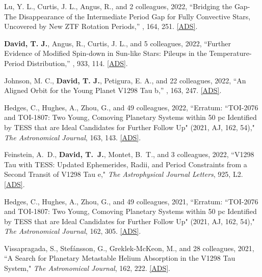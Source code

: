 \item {{Lu}, Y. L.}, {{Curtis}, J. L.}, {{Angus}, R.}, and 2 colleagues, 2022, ``{Bridging the Gap-The Disappearance of the Intermediate Period Gap for Fully Convective Stars, Uncovered by New ZTF Rotation Periods},'' \textit{\aj}, 164, 251. \href{https://ui.adsabs.harvard.edu/abs/2022AJ....164..251L}{[ADS]}.

\item {{\bf{David}, T. J.}}, {{Angus}, R.}, {{Curtis}, J. L.}, and 5 colleagues, 2022, ``{Further Evidence of Modified Spin-down in Sun-like Stars: Pileups in the Temperature-Period Distribution},'' \textit{\apj}, 933, 114. \href{https://ui.adsabs.harvard.edu/abs/2022ApJ...933..114D}{[ADS]}.

\item {{Johnson}, M. C.}, {{\bf{David}, T. J.}}, {{Petigura}, E. A.}, and 22 colleagues, 2022, ``{An Aligned Orbit for the Young Planet V1298 Tau b},'' \textit{\aj}, 163, 247. \href{https://ui.adsabs.harvard.edu/abs/2022AJ....163..247J}{[ADS]}.

\item {{Hedges}, C., {Hughes}, A., {Zhou}, G., and 49 colleagues}, 2022, ``{Erratum: ``TOI-2076 and TOI-1807: Two Young, Comoving Planetary Systems within 50 pc Identified by TESS that are Ideal Candidates for Further Follow Up" (2021, AJ, 162, 54)}," \textit{The Astronomical Journal}, 163, 143. \href{https://ui.adsabs.harvard.edu/abs/2022AJ....163..143H/abstract}{[ADS]}.

\item {{Feinstein}, A.~D., \textbf{{David}, T.~J.}, {Montet}, B.~T., and 3 colleagues}, 2022, ``{V1298 Tau with TESS: Updated Ephemerides, Radii, and Period Constraints from a Second Transit of V1298 Tau e}," \textit{The Astrophysical Journal Letters}, 925, L2. \href{https://ui.adsabs.harvard.edu/abs/2022ApJ...925L...2F/abstract}{[ADS]}.

\item {{Hedges}, C., {Hughes}, A., {Zhou}, G., and 49 colleagues}, 2021, ``{Erratum: ``TOI-2076 and TOI-1807: Two Young, Comoving Planetary Systems within 50 pc Identified by TESS that are Ideal Candidates for Further Follow Up" (2021, AJ, 162, 54)}," \textit{The Astronomical Journal}, 162, 305. \href{https://ui.adsabs.harvard.edu/abs/2021AJ....162..305H/abstract}{[ADS]}.

\item {{Vissapragada}, S., {Stef{\'a}nsson}, G., {Greklek-McKeon}, M., and 28 colleagues}, 2021, ``{A Search for Planetary Metastable Helium Absorption in the V1298 Tau System}," \textit{The Astronomical Journal}, 162, 222. 
\href{https://ui.adsabs.harvard.edu/abs/2021AJ....162..222V/abstract}{[ADS]}.

